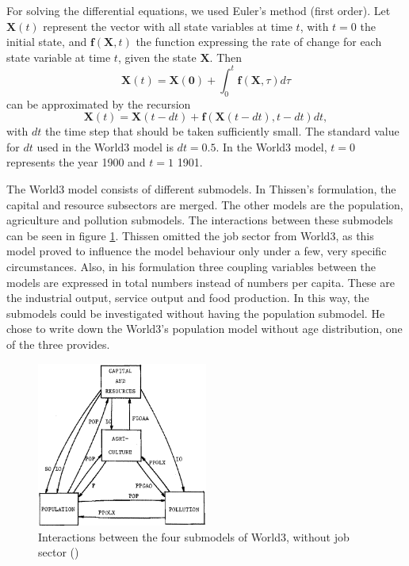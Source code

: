 \documentclass[10pt,a4paper]{scrartcl}
\begin{document}
For solving the differential equations, we used Euler's method (first order). Let $\mathbf{X}(t)$ represent the vector with all state variables at time $t$, with $t=0$ the initial state, and $\mathbf{f}(\mathbf{X}, t)$ the function expressing the rate of change for each state variable at time $t$, given the state $\mathbf{X}$. Then
\begin{equation}
\mathbf{X}(t) = \mathbf{X(0)} + \int_0^t \mathbf{f}(\mathbf{X}, \tau) d\tau
\end{equation}
can be approximated by the recursion
\begin{equation}
\mathbf{X}(t) = \mathbf{X}(t-dt) + \mathbf{f}(\mathbf{X}(t-dt), t-dt) dt,
\end{equation}
with $dt$ the time step that should be taken sufficiently small. The standard value for $dt$ used in the World3 model is $dt=0.5$. In the World3 model, $t=0$ represents the year 1900 and $t=1$ 1901.

The World3 model consists of different submodels. In Thissen's formulation, the capital and resource subsectors are merged. The other models are the population, agriculture and pollution submodels. The interactions between these submodels can be seen in figure \ref{interactions}. Thissen omitted the job sector from World3, as this model proved to influence the model behaviour only under a few, very specific circumstances. Also, in his formulation three coupling variables between the models are expressed in total numbers instead of numbers per capita. These are the industrial output, service output and food production. In this way, the submodels could be investigated without having the population submodel. He chose to write down the World3's population model without age distribution, one of the three \cite{meadows1974dynamics} provides.

\begin{figure}
\centering
\includegraphics[width=0.5\textwidth]{./plaatjes/submodel-interactions.png}
\caption{Interactions between the four submodels
of World3, without job sector (\cite{thissen1978investigations})}
\label{interactions}
\end{figure}
\end{document}
